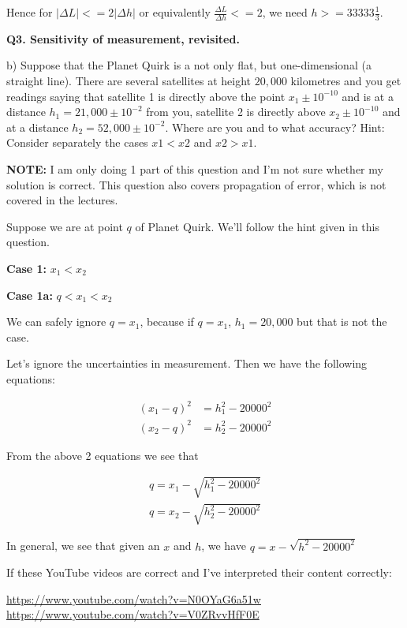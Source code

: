 \documentclass[9pt]{article}
\begin{document}
Hence for $|\Delta L| <= 2 |\Delta h|$ or equivalently $\frac{\Delta L}{\Delta h} <= 2$, we need $h >= 33333 \frac{1}{3}$.
 
\begin{tcolorbox}
  \textbf{Q3. Sensitivity of measurement, revisited.}

  b) Suppose that the Planet Quirk is a not only flat, but one-dimensional (a straight line). There are several satellites at height $20,000$ kilometres and you get readings saying that satellite 1 is directly above the point $x_1 \pm 10^{-10}$ and is at a distance $h_1 = 21,000 \pm 10^{-2}$ from you, satellite 2 is directly above $x_2 \pm 10^{-10}$ and at a distance $h_2 = 52,000 \pm 10^{-2}$. Where are you and to what accuracy? Hint: Consider separately the cases $x1 < x2$ and $x2 > x1$.
\end{tcolorbox}

\textbf{NOTE:} I am only doing 1 part of this question and I'm not sure whether my solution is correct. This question also covers propagation of error, which is not covered in the lectures.

Suppose we are at point $q$ of Planet Quirk. We'll follow the hint given in this question.

\textbf{Case 1:} $x_1 < x_2$

\textbf{Case 1a:} $q < x_1 < x_2$

We can safely ignore $q = x_1$, because if $q = x_1$, $h_1 = 20,000$ but that is not the case.

Let's ignore the uncertainties in measurement. Then we have the following equations:

\begin{align}
  (x_1 - q)^2 &= h_1^2 - 20000^2 \\
  (x_2 - q)^2 &= h_2^2 - 20000^2
\end{align}

From the above 2 equations we see that

\begin{align}
  q = x_1 - \sqrt{h_1^2 - 20000^2} \\
  q = x_2 - \sqrt{h_2^2 - 20000^2}
\end{align}

In general, we see that given an $x$ and $h$, we have $q = x - \sqrt{h^2 - 20000^2}$

If these YouTube videos are correct and I've interpreted their content correctly:

\url{https://www.youtube.com/watch?v=N0OYaG6a51w} \\
\url{https://www.youtube.com/watch?v=V0ZRvvHfF0E}
\end{document}
